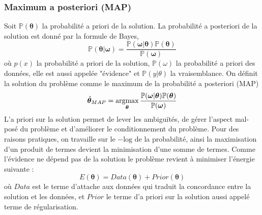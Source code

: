 \documentclass[../main/These_Mathias_Paget.tex]{subfiles}
\begin{document}

\subsubsection{Maximum a posteriori (MAP)}

Soit $\mathbb{P}(\boldsymbol{\theta})$ la probabilité a priori de la solution. La probabilité a posteriori de la solution est donné par la formule de Bayes,
\begin{equation}
\mathbb{P}(\boldsymbol{\theta}|\boldsymbol{\omega}) = \frac{\mathbb{P}(\boldsymbol{\omega}|\boldsymbol{\theta})\mathbb{P}(\boldsymbol{\theta})}{\mathbb{P}(\boldsymbol{\omega})}
\end{equation}
où $p(x)$ la probabilité a priori de la solution, $\mathbb{P}(\omega)$ la probabilité a priori des données, elle est aussi appelée "évidence" et $\mathbb{P}(y|\theta)$ la vraisemblance. On définit la solution du problème comme le maximum de la probabilité a posteriori (MAP)
\begin{equation}
\hat{\boldsymbol{\theta}}_{MAP} =  \argmax_{\boldsymbol{\theta}}{ \frac{\mathbb{P}(\boldsymbol{\omega}|\boldsymbol{\theta})\mathbb{P}(\boldsymbol{\theta})}{\mathbb{P}(\boldsymbol{\omega})}}
\end{equation}
L'a priori sur la solution permet de lever les ambiguïtés, de gérer l'aspect mal-posé du problème et d'améliorer le conditionnement du problème. Pour des raisons pratiques, on travaille sur le $-\text{log}$ de la probabilité, ainsi la maximisation d'un produit de termes devient la minimisation d'une somme de termes. Comme l'évidence ne dépend pas de la solution le problème revient à minimiser l’énergie suivante :
\begin{equation}
E(\boldsymbol{\theta}) = Data(\boldsymbol{\theta}) + Prior(\boldsymbol{\theta})
\end{equation}
où $Data$ est le terme d'attache aux données qui traduit la concordance entre la solution et les données, et $Prior$ le terme d'a priori sur la solution aussi appelé terme de régularisation.
\end{document}
